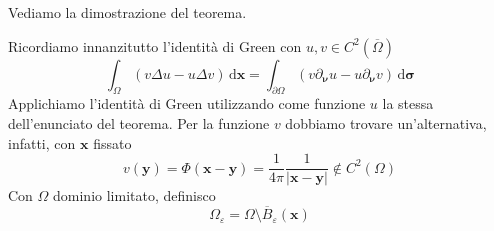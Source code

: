 \documentclass[10pt,a4paper,twoside,openright]{book}
\newcommand{\x}{\mathbf{x}}
\newcommand{\y}{\mathbf{y}}
\newcommand{\sigg}{\bm{\sigma}}
\newcommand{\nuu}{\bm{\nu}}
\newcommand{\de}{\,\mathrm d}
\newcommand{\dxx}{\de \x}
\newcommand{\dsig}{\de \sigg}
\begin{document}
Vediamo la dimostrazione del teorema.
\begin{dimostrazione}
    Ricordiamo innanzitutto l'identità di Green con $\displaystyle u,v\in C^{2}(\overline{\Omega })$
    \begin{equation*}
        \int _{\Omega }(v\Delta u-u\Delta v) \dxx =\int _{\partial \Omega }(v\partial _{\nuu} u-u\partial _{\nuu} v) \dsig
    \end{equation*}
    Applichiamo l'identità di Green utilizzando come funzione $u$ la stessa dell'enunciato del teorema. Per la funzione $v$ dobbiamo trovare un'alternativa, infatti, con $\x$ fissato
    \begin{equation*}
        v(\y) =\Phi (\x -\y) =\frac{1}{4\pi }\frac{1}{| \x -\y| } \notin C^{2}(\Omega)
    \end{equation*}
    Con $\displaystyle \Omega $ dominio limitato, definisco
    \begin{equation*}
        \Omega _{\varepsilon } =\Omega \setminus \overline{B}_{\varepsilon }(\x)
    \end{equation*}
    \begin{figure}[H]
        \centering

        \begin{tikzpicture}[x=0.75pt,y=0.75pt,yscale=-1,xscale=1]


\end{tikzpicture}
\end{figure}
\end{dimostrazione}
\end{document}
